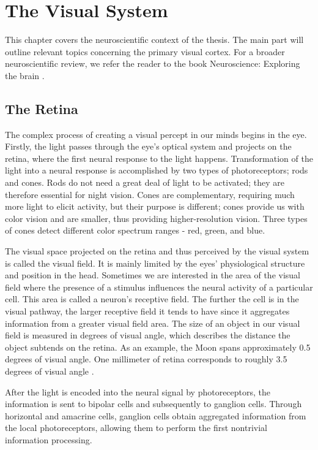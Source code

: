 \chapter{The Visual System}

This chapter covers the neuroscientific context of the thesis. The main part will outline relevant topics concerning the primary visual cortex. For a broader neuroscientific review, we refer the reader to the book Neuroscience: Exploring the brain \citep{bear2020neuroscience}.


\section{The Retina}

The complex process of creating a visual percept in our minds begins in the eye. Firstly, the light passes through the eye’s optical system and projects on the retina, where the first neural response to the light happens. Transformation of the light into a neural response is accomplished by two types of photoreceptors; rods and cones.
Rods do not need a great deal of light to be activated; they are therefore essential for night vision. Cones are complementary, requiring much more light to elicit activity, but their purpose is different; cones provide us with color vision and are smaller, thus providing higher-resolution vision. Three types of cones detect different color spectrum ranges - red, green, and blue.

The visual space projected on the retina and thus perceived by the visual system is called the visual field. It is mainly limited by the eyes’ physiological structure and position in the head. Sometimes we are interested in the area of the visual field where the presence of a stimulus influences the neural activity of a particular cell. This area is called a neuron’s receptive field. The further the cell is in the visual pathway, the larger receptive field it tends to have since it aggregates information from a greater visual field area. The size of an object in our visual field is measured in degrees of visual angle, which describes the distance the object subtends on the retina. As an example, the Moon spans approximately 0.5 degrees of visual angle. One millimeter of retina corresponds to roughly 3.5 degrees of visual angle \citep{bear2020neuroscience}.

After the light is encoded into the neural signal by photoreceptors, the information is sent to bipolar cells and subsequently to ganglion cells. Through horizontal and amacrine cells, ganglion cells obtain aggregated information from the local photoreceptors, allowing them to perform the first nontrivial information processing.

